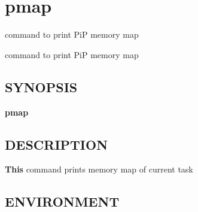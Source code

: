 \hypertarget{group__pmap}{\section{pmap}
\label{group__pmap}
}


command to print Pi\-P memory map  


command to print Pi\-P memory map \hypertarget{group__piplnlibs_synopsis}{}\subsection{S\-Y\-N\-O\-P\-S\-I\-S}\label{group__piplnlibs_synopsis}
{\bfseries pmap} \hypertarget{group__piplnlibs_description}{}\subsection{D\-E\-S\-C\-R\-I\-P\-T\-I\-O\-N}\label{group__piplnlibs_description}
{\bfseries This} command prints memory map of current task\hypertarget{group__piplnlibs_environment}{}\subsection{E\-N\-V\-I\-R\-O\-N\-M\-E\-N\-T}\label{group__piplnlibs_environment}
